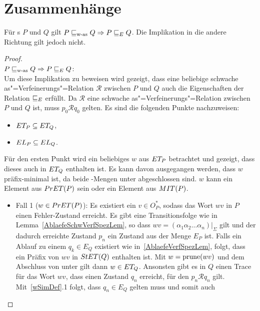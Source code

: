 \section{Zusammenhänge}

\begin{Satz}
  \label{ZusammenhFehlerSatz}
  Für \MEIO{}s $P$ und $Q$ gilt $P\sqsubseteq _{\mathrm{w}\text{-}\mathrm{as}} Q\Rightarrow P \sqsubseteq  _E Q$. Die
  Implikation in die andere Richtung gilt jedoch nicht.
\end{Satz}
\begin{proof}\mbox{}\\
  $P\sqsubseteq _{\mathrm{w}\text{-}\mathrm{as}} Q\Rightarrow P \sqsubseteq  _E Q$:\\
  Um diese Implikation zu beweisen wird gezeigt, dass eine beliebige
  schwache as"=Verfeinerungs"=Relation $\mathcal{R}$ zwischen $P$ und $Q$ auch
  die Eigenschaften der Relation $ \sqsubseteq  _E$ erfüllt. Da $\mathcal{R}$ eine
  schwache as"=Verfeinerungs"=Relation zwischen $P$ und $Q$ ist, muss $p_0
  \mathcal{R} q_0$ gelten. Es sind die folgenden Punkte nachzuweisen:
  \begin{itemize}
    \item $ET _P \subseteq ET _Q$,
    \item $EL _P \subseteq EL _Q$.
  \end{itemize}
  Für den ersten Punkt wird ein beliebiges $w$ aus $ET _P$ betrachtet und
  gezeigt, dass dieses auch in $ET _Q$ enthalten ist. Es kann davon
  ausgegangen werden, dass $w$ präfix-minimal ist, da beide \ET{}-Mengen unter
  \cont{} abgeschlossen sind. $w$ kann ein Element aus $PrET (P)$ sein oder
  ein Element aus $MIT (P)$.
  \begin{itemize}
    \item Fall 1 ($w\in PrET (P)$): Es existiert ein $v\in O_P^*$, sodass das
      Wort $wv$ in $P$ einen Fehler-Zustand erreicht. Es gibt eine
      Transitionsfolge wie in Lemma~\ref{AblaefeSchwVerfSpezLem}, so dass $wv =
      (\alpha _1\alpha _2\dots \alpha _n)|_{\Sigma}$ gilt und der dadurch
      erreichte Zustand $p_n$ ein Zustand aus der Menge $E_P$ ist. Falls ein
      Ablauf zu einem $q_k\in E_Q$ existiert wie in~\ref{AblaefeVerfSpezLem},
      folgt, dass ein Präfix von $wv$ in $StET (Q)$ enthalten ist. Mit
      $w=\mathrm{prune} (wv)$ und dem Abschluss von \ET{} unter \cont{} gilt dann
      $w\in ET _Q$. Ansonsten gibt es in $Q$ einen Trace für das Wort $wv$,
      dass einen Zustand $q_n$ erreicht, für den $p_n \mathcal{R} q_n$ gilt.
      Mit~\ref{wSimDef}.1 folgt, dass $q_n\in E_Q$ gelten muss und somit auch

\end{itemize}
\end{proof}
